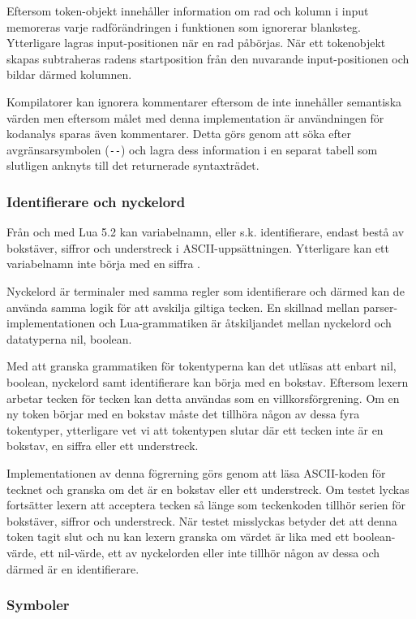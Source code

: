 Eftersom token-objekt innehåller information om rad och kolumn i input
memoreras varje radförändringen i funktionen som ignorerar blanksteg.
Ytterligare lagras input-positionen när en rad påbörjas. När ett tokenobjekt
skapas subtraheras radens startposition från den nuvarande input-positionen
och bildar därmed kolumnen.

Kompilatorer kan ignorera kommentarer eftersom de inte innehåller semantiska
värden men eftersom målet med denna implementation är användningen för
kodanalys sparas även kommentarer. Detta görs genom att söka efter
avgränsarsymbolen (\verb+--+) och lagra dess information i en separat tabell
som slutligen anknyts till det returnerade syntaxträdet.

\subsubsection{Identifierare och nyckelord}

Från och med Lua 5.2 kan variabelnamn, eller s.k. identifierare, endast bestå av
bokstäver, siffror och understreck i ASCII-uppsättningen. Ytterligare kan ett
variabelnamn inte börja med en siffra \citep{luaref}.

Nyckelord är terminaler med samma regler som identifierare och därmed kan de
använda samma logik för att avskilja giltiga tecken. En skillnad mellan
parser-implementationen och Lua-grammatiken är åtskiljandet mellan nyckelord
och datatyperna nil, boolean.

Med att granska grammatiken för tokentyperna kan det utläsas att enbart nil,
boolean, nyckelord samt identifierare kan börja med en bokstav. Eftersom
lexern arbetar tecken för tecken kan detta användas som en villkorsförgrening.
Om en ny token börjar med en bokstav måste det tillhöra någon av dessa fyra
tokentyper, ytterligare vet vi att tokentypen slutar där ett tecken inte är en
bokstav, en siffra eller ett understreck.

Implementationen av denna fögrerning görs genom att läsa ASCII-koden för
tecknet och granska om det är en bokstav eller ett understreck. Om testet
lyckas fortsätter lexern att acceptera tecken så länge som teckenkoden tillhör
serien för bokstäver, siffror och understreck. När testet misslyckas betyder
det att denna token tagit slut och nu kan lexern granska om värdet är lika med
ett boolean-värde, ett nil-värde, ett av nyckelorden eller inte tillhör någon
av dessa och därmed är en identifierare.

\subsubsection{Symboler}

